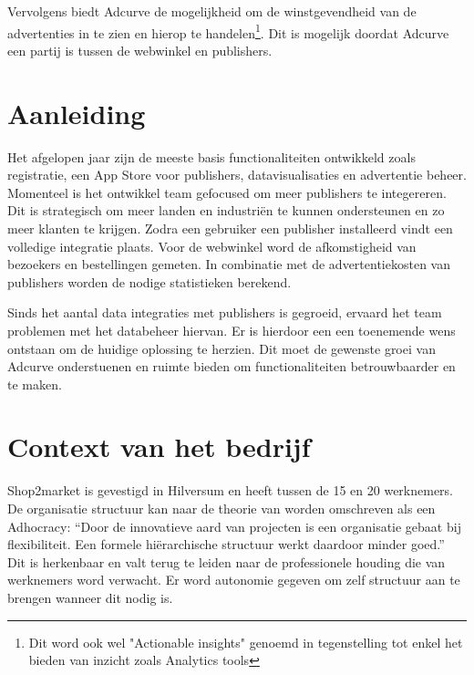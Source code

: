 Vervolgens biedt Adcurve de mogelijkheid om de winstgevendheid van de advertenties in te zien en hierop te handelen\footnote{Dit word ook wel "Actionable insights" genoemd in tegenstelling tot enkel het bieden van inzicht zoals Analytics tools}. Dit is mogelijk doordat Adcurve een partij is tussen de webwinkel en publishers.

\section{Aanleiding} %

Het afgelopen jaar zijn de meeste basis functionaliteiten ontwikkeld zoals registratie, een App Store voor publishers, datavisualisaties en advertentie beheer. Momenteel is het ontwikkel team gefocused om meer publishers te integereren. Dit is strategisch om meer landen en industriën te kunnen ondersteunen en zo meer klanten te krijgen. Zodra een gebruiker een publisher installeerd vindt een volledige integratie plaats. Voor de webwinkel word de afkomstigheid van bezoekers en bestellingen gemeten. In combinatie met de advertentiekosten van publishers worden de nodige statistieken berekend.

Sinds het aantal data integraties met publishers is gegroeid, ervaard het team problemen met het databeheer hiervan. Er is hierdoor een een toenemende wens ontstaan om de huidige oplossing te herzien. Dit moet de gewenste groei van Adcurve onderstuenen en ruimte bieden om functionaliteiten betrouwbaarder en te maken.

\section{Context van het bedrijf} %

Shop2market is gevestigd in Hilversum en heeft tussen de 15 en 20 werknemers. De organisatie structuur kan naar de theorie van \autocite{mintzberg} worden omschreven als een Adhocracy: “Door de innovatieve aard van projecten is een organisatie gebaat bij flexibiliteit. Een formele hiërarchische structuur werkt daardoor minder goed.” Dit is herkenbaar en valt terug te leiden naar de professionele houding die van werknemers word verwacht. Er word autonomie gegeven om zelf structuur aan te brengen wanneer dit nodig is.

